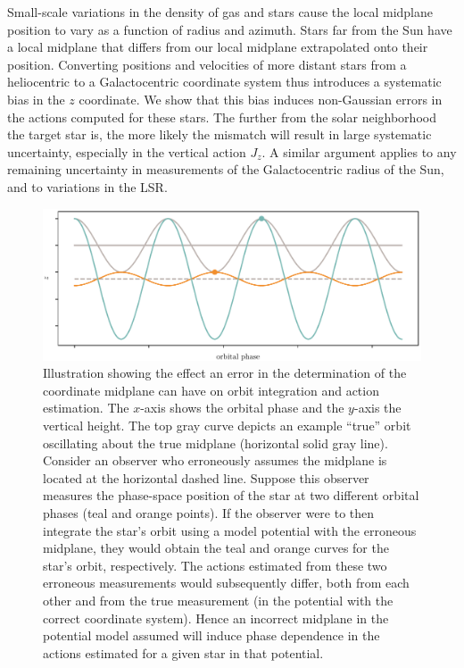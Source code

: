 \documentclass[twocolumn]{aastex62}
\begin{document}
Small-scale variations in the density of gas and stars cause the local
midplane position to vary as a function of radius and azimuth. Stars far from
the Sun have a local midplane that differs from our local midplane
extrapolated onto their position. Converting positions and velocities of more
distant stars from a heliocentric to a Galactocentric coordinate system thus
introduces a systematic bias in the $z$ coordinate. We show that this bias
induces non-Gaussian errors in the actions computed for these stars. The
further from the solar neighborhood the target star is, the more likely the
mismatch will result in large systematic uncertainty, especially in the
vertical action $J_z$. A similar argument applies to any remaining uncertainty
in measurements of the Galactocentric radius of the Sun, and to variations in
the LSR.

\begin{figure}[ht!]
\begin{center}
\includegraphics[width=\textwidth]{fig/cartoon.pdf}
\end{center}
\caption{Illustration showing the effect an error in the determination
of the coordinate midplane can have on orbit integration and action
estimation. The $x$-axis shows the orbital phase and the $y$-axis the vertical
height. The top gray curve depicts an example ``true'' orbit oscillating about
the true midplane (horizontal solid gray line). Consider an observer who
erroneously assumes the midplane is located at the horizontal dashed line.
Suppose this observer measures the phase-space position of the star at two
different orbital phases (teal and orange points). If the observer were to
then integrate the star's orbit using a model potential with the erroneous
midplane, they would obtain the teal and orange curves for the star's orbit,
respectively. The actions estimated from these two erroneous measurements
would subsequently differ, both from each other and from the true measurement
(in the potential with the correct coordinate system). Hence an incorrect
midplane in the potential model assumed will induce phase dependence in the
actions estimated for a given star in that potential.} \label{fig:cartoon}
\end{figure}
\end{document}
